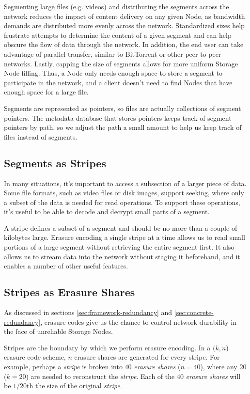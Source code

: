 \documentclass[8pt,fleqn,openany]{book}
\begin{document}
Segmenting large files (e.g. videos) and distributing the segments
across the network reduces the impact of content delivery on any
given Node, as
bandwidth demands are distributed more evenly across the network.
Standardized sizes help frustrate attempts to determine the content of a given
segment and can help obscure the flow of data through the network.
In addition, the end user can take advantage of parallel transfer, similar to
BitTorrent or other peer-to-peer networks. Lastly, capping the size of segments
allows for more uniform Storage Node filling. Thus, a Node only needs enough
space to store a segment to participate in the network,
and a client doesn't need
to find Nodes that have enough space for a large file.

Segments are represented as pointers, so files are actually
collections of segment pointers. The metadata database that stores
pointers keeps track of segment pointers by path, so we adjust the
path a small amount to help us keep track of files instead of
segments.

\subsection{Segments as Stripes}

In many situations, it's important to access a subsection of a larger piece of
data. Some file formats, such as video files or disk images, support seeking,
where only a subset of the data is needed for read operations.
To support these operations,
it's useful to be able to decode and decrypt small parts of a segment.

A stripe defines a subset of a segment and should be no more than a
couple of kilobytes large. Erasure encoding
a single stripe at a time allows us to read small portions of a
large segment without retrieving the entire segment first.
It also allows us to stream data into the
network without staging it beforehand, and it enables a number of other useful
features.

\subsection{Stripes as Erasure Shares}

As discussed in sections \ref{sec:framework-redundancy} and
\ref{sec:concrete-redundancy}, erasure codes
give us the chance to control network durability in the face
of unreliable Storage Nodes.

Stripes are the boundary by which we perform erasure encoding.
In a $(k, n$) erasure code scheme, $n$ erasure shares are generated for
every stripe.
For example, perhaps a {\em stripe} is broken into 40 {\em erasure shares}
($n=40$), where any 20 ($k=20$) are needed to reconstruct the {\em stripe}. Each
of the 40 {\em erasure shares} will be $1/20$th the size of the original
{\em stripe}.
\end{document}
